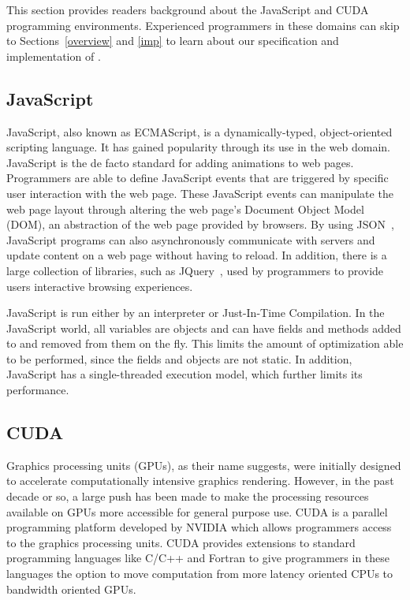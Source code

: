 
This section provides readers background about the JavaScript and CUDA
programming environments. Experienced programmers in these domains can skip to
Sections~\ref{overview} and \ref{imp} to learn about our specification and
implementation of \namens.

\subsection{JavaScript} JavaScript, also known as ECMAScript, is a
dynamically-typed, object-oriented scripting language.  It has gained popularity
through its use in the web domain. JavaScript is the de facto standard for
adding animations to web pages. Programmers are able to define JavaScript events
that are triggered by specific user interaction with the web page. These
JavaScript events can manipulate the web page layout through altering the web
page's Document Object Model (DOM), an abstraction of the web page provided by
browsers. By using JSON~\cite{json}, JavaScript programs can also asynchronously
communicate with servers and update content on a web page without having to
reload. In addition, there is a large collection of libraries, such as
JQuery~\cite{JQuery}, used by programmers to provide users interactive browsing
experiences.

JavaScript is run either by an interpreter or Just-In-Time Compilation. In the
JavaScript world, all variables are objects and can have fields and methods
added to and removed from them on the fly. This limits the amount of
optimization able to be performed, since the fields and objects are not static. In
addition, JavaScript has a single-threaded execution model, which further limits
its performance.

\subsection{CUDA} Graphics processing units (GPUs), as their name suggests, were
initially designed to accelerate computationally intensive graphics rendering.
However, in the past decade or so, a large push has been made to make the
processing resources available on GPUs more accessible for general purpose use.
CUDA is a parallel programming platform developed by NVIDIA which allows
programmers access to the graphics processing units. CUDA provides extensions to
standard programming languages like C/C++ and Fortran to give programmers in
these languages the option to move computation from more latency oriented CPUs
to bandwidth oriented GPUs. 

